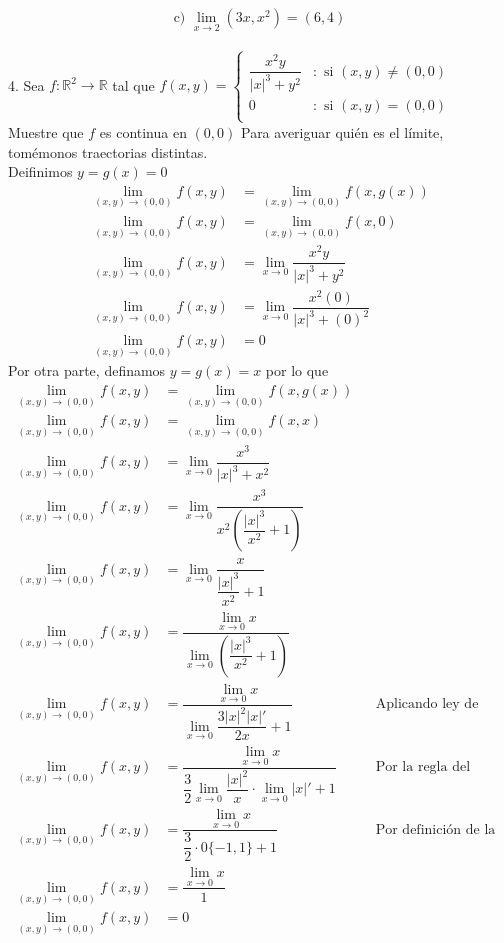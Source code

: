 \documentclass[letterpaper]{article}
\providecommand{\abs}[1]{\left|#1\right|}
\renewcommand{\*}{\cdot}
\theoremstyle{definition}
\begin{document}
$$\text{c) }\displaystyle\lim_{x \to 2} (3x , x^2) = (6,4) $$\\[0.5cm]
4.  Sea $f: \mathbb{R}^2  \longrightarrow \mathbb{R}$ tal que $f(x,y) = \left\{
     \begin{array}{cl}
       \dfrac{x^2y}{\vert x \vert^3 + y^2} & : \text{ si } (x,y) \neq (0,0)\\
       0 & : \text{ si } (x,y) = (0,0)\\
     \end{array}
   \right.$ \\Muestre que $f$ es continua en $(0,0)$
Para averiguar quién es el límite, tomémonos traectorias distintas. \\
Deifinimos $ y = g(x) = 0 $
\begin{align*}
	\lim\limits_{(x,y)\to (0,0)} f(x,y) &= \lim\limits_{(x,y) \to (0,0)} f(x,g(x))\\
	\lim\limits_{(x,y)\to (0,0)} f(x,y) &= \lim\limits_{(x,y) \to (0,0)} f(x,0)\\
	\lim\limits_{(x,y)\to (0,0)} f(x,y) &= \lim\limits_{x \to 0} \dfrac{x^2y}{\vert x \vert^3 + y^2} \\
	\lim\limits_{(x,y)\to (0,0)} f(x,y) &= \lim\limits_{x \to 0} \dfrac{x^2(0)}{\vert x \vert^3 + (0)^2} \\
	\lim\limits_{(x,y)\to (0,0)} f(x,y) &= 0
\end{align*}
Por otra parte, definamos $ y = g(x) = x$ por lo que
\begin{align*}
	\lim\limits_{(x,y)\to (0,0)} f(x,y) &= \lim\limits_{(x,y) \to (0,0)} f(x,g(x))\\
	\lim\limits_{(x,y)\to (0,0)} f(x,y) &= \lim\limits_{(x,y) \to (0,0)} f(x,x)\\
	\lim\limits_{(x,y)\to (0,0)} f(x,y) &= \lim\limits_{x \to 0} \dfrac{x^3}{\vert x \vert^3 + x^2} \\
	\lim\limits_{(x,y)\to (0,0)} f(x,y) &= \lim\limits_{x \to 0} \dfrac{x^3}{x^2  \left( \dfrac{\abs{x}^3}{x^2} + 1 \right) } \\
	\lim\limits_{(x,y)\to (0,0)} f(x,y) &= \lim\limits_{x \to 0} \dfrac{x}{\dfrac{\abs{x}^3}{x^2} + 1 } \\
	\lim\limits_{(x,y)\to (0,0)} f(x,y) &=  \dfrac{\lim\limits_{x \to 0} x}{\lim\limits_{x \to 0} \left( \dfrac{\abs{x}^3}{x^2} + 1 \right) } \\
	\lim\limits_{(x,y)\to (0,0)} f(x,y) &=  \dfrac{\lim\limits_{x \to 0} x}{\lim\limits_{x \to 0}  \dfrac{3\abs{x}^2 \abs{x}'}{2x} + 1  }  && \text{Aplicando ley de L'Hôpital}\\
	\lim\limits_{(x,y)\to (0,0)} f(x,y) &=  \dfrac{\lim\limits_{x \to 0} x}{ \dfrac{3}{2} \lim\limits_{x \to 0}  \dfrac{\abs{x}^2}{x}\* \lim\limits_{x \to 0} \abs{x}'  + 1  }  && \text{Por la regla del producto}\\
	\lim\limits_{(x,y)\to (0,0)} f(x,y) &=  \dfrac{\lim\limits_{x \to 0} x}{ \dfrac{3}{2} \* 0\{-1,1\}  + 1  }  && \text{Por definición de la derivada del valor absoluto }\\
	\lim\limits_{(x,y)\to (0,0)} f(x,y) &=  \dfrac{\lim\limits_{x \to 0} x}{1}  && \text{}\\
	\lim\limits_{(x,y)\to (0,0)} f(x,y) &=  0 && \text{}\\
\end{align*}
\end{document}
